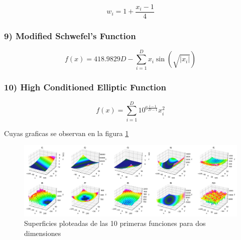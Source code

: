 \[
w_i = 1 + \frac{x_i - 1}{4}
\]

\subsubsection*{9) Modified Schwefel's Function}
\[
f(x) = 418.9829 D - \sum_{i=1}^{D} x_i \sin(\sqrt{|x_i|})
\]

\subsubsection*{10) High Conditioned Elliptic Function}
\[
f(x) = \sum_{i=1}^{D} 10^{6 \frac{i-1}{D-1}} x_i^2
\]

Cuyas graficas se observan en la figura \ref{fig:cec}

\begin{figure}[H]
	\centering
	\includegraphics[width=1\linewidth]{img/cec}
	\caption{Superficies ploteadas de las 10 primeras funciones para dos dimensiones \cite{plot}}
	\label{fig:cec}
\end{figure}